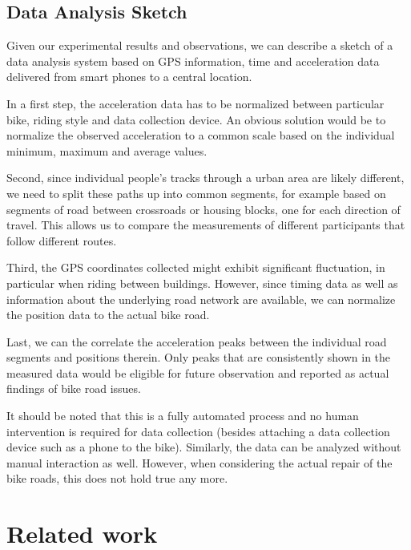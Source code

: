 \documentclass[a4paper,11pt]{article}
\begin{document}
\subsection{Data Analysis Sketch}
Given our experimental results and observations, we can describe a sketch of a data analysis system based on GPS information, time and acceleration data delivered from smart phones to a central location. 

In a first step, the acceleration data has to be normalized between particular bike, riding style and data collection device. An obvious solution would be to normalize the observed acceleration to a common scale based on the individual minimum, maximum and average values. 

Second, since individual people's tracks through a urban area are likely different, we need to split these paths up into common segments, for example based on segments of road between crossroads or housing blocks, one for each direction of travel. This allows us to compare the measurements of different participants that follow different routes. 

Third, the GPS coordinates collected might exhibit significant fluctuation, in particular when riding between buildings. However, since  timing data as well as information about the underlying road network are available, we can normalize the position data to the actual bike road. 

Last, we can the correlate the acceleration peaks between the individual road segments and positions therein. Only peaks that are consistently shown in the measured data would be eligible for future observation and reported as actual findings of bike road issues. 

It should be noted that this is a fully automated process and no human intervention is required for data collection (besides attaching a data collection device such as a phone to the bike). Similarly, the data can be analyzed without manual interaction as well. However, when considering the actual repair of the bike roads, this does not hold true any more.


\section{Related work}
\end{document}
